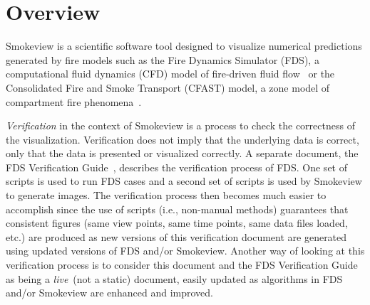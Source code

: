 \documentclass[11pt,twoside]{book}
\begin{document}
\cleardoublepage
\tableofcontents

\cleardoublepage
\listoffigures

\mainmatter


%
%
%

\chapter{Overview}
Smokeview is a scientific software tool designed to visualize numerical predictions
generated by fire models such as the Fire Dynamics Simulator (FDS), a computational
fluid dynamics (CFD) model of fire-driven fluid flow~\cite{FDS_Math_Guide,FDS_Users_Guide}
or the Consolidated Fire and Smoke Transport (CFAST) model, a zone model of compartment
fire phenomena~\cite{Jones:2004A}.



{\em Verification} in the context of Smokeview is a process to check the correctness
of the visualization.  Verification does not imply that the underlying data is correct,
only that the data is presented or visualized correctly. A separate document, the
FDS Verification Guide~\cite{FDS_Verification_Guide}, describes the verification
process of FDS.  One set of scripts is used to run FDS cases and a second set of
scripts is used by Smokeview to generate images.  The verification process then
becomes much easier to accomplish since the use of scripts (i.e., non-manual methods)
guarantees that consistent figures (same view points, same time points, same data files
loaded, etc.) are produced as new versions of this verification document are
generated using updated versions of FDS and/or Smokeview.  Another way of looking
at this verification process is to consider this document and the FDS Verification
Guide~\cite{FDS_Verification_Guide} as being a {\em  live}\ (not a static) document,
easily updated as algorithms in FDS and/or Smokeview are enhanced and improved.
\end{document}
